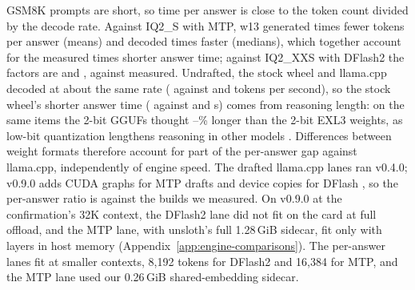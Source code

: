 \documentclass[11pt,letterpaper]{article}
\begin{document}
GSM8K prompts are short, so time per answer is close to the token count divided by the decode
rate. Against IQ2\_S with MTP, w13 generated \PeQTokRatioIsMtp{} times fewer
tokens per answer (means) and decoded \PeQTpsRatioIsMtp{} times faster
(medians), which
together account for the measured \PeQRatioIsMtp{} times shorter answer time;
against IQ2\_XXS with DFlash2 the factors are \PeQTokRatioIxxsDf{} and
\PeQTpsRatioIxxsDf, against \PeQRatioIxxsDf{} measured. Undrafted, the stock
wheel and llama.cpp decoded at about the same rate (\PeQGsmExlNoTps{} against
\PeQGsmIsTps{} and \PeQGsmIxxsTps{} tokens per second), so the stock wheel's
shorter answer time (\PeQGsmExlNoWall{} against \PeQGsmIsWall{} and
\PeQGsmIxxsWall{} s) comes from reasoning length: on the same items the 2-bit
GGUFs thought \PeQLongerMin--\PeQLongerMax\% longer than the 2-bit EXL3
weights, as low-bit quantization lengthens reasoning in other models
\citep{liu2025quantization}. Differences between weight formats therefore account for part of the
per-answer gap against llama.cpp, independently of engine speed. The drafted llama.cpp lanes ran v0.4.0; v0.9.0 adds
CUDA graphs for MTP drafts and device copies for DFlash
\citep{ggml2026llamacpp090}, so the per-answer ratio is against the builds we
measured. On v0.9.0 at the confirmation's 32K context, the DFlash2 lane did
not fit on the card at full offload, and the MTP lane, with unsloth's full
1.28\,GiB sidecar, fit only with layers in host memory
(Appendix~\ref{app:engine-comparisons}). The per-answer lanes fit at smaller contexts,
8,192 tokens for DFlash2 and 16,384 for MTP, and the MTP lane used our
0.26\,GiB shared-embedding sidecar.
\end{document}
